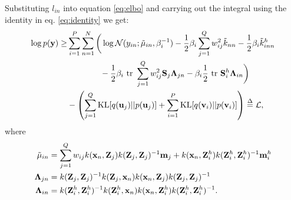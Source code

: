 
\noindent Substituting $l_{in}$ into equation \ref{eq:elbo} and carrying out the integral using the identity in eq. \ref{eq:identity} we get:
\begin{align}
\nonumber
\log p(\mathbf{y})
\ge& \sum_{i=1}^P \sum_{n=1}^N
\bigg( \log \mathcal{N}(y_{in}; \tilde{\mu}_{in}, \beta_i^{-1})
          - \frac{1}{2} \beta_i \sum_{j=1}^Q w_{ij}^2        \tilde{k}_{nn} - \frac{1}{2} \beta_i \tilde{k}^h_{inn}
 \\ \nonumber
         &\quad \quad \quad \quad - \frac{1}{2} \beta_i \mbox{ \rm tr }  \sum_{j=1}^Q w_{ij}^2 \mathbf{S}_j \mathbf{\Lambda}_{jn} - \beta_i \frac{1}{2} \mbox{ \rm tr } \mathbf{S}^h_i \mathbf{\Lambda}_{in} 
\bigg) \\
&- \left(\sum_{j=1}^Q \text{KL}[q(\mathbf{u}_j) || p(\mathbf{u}_j)] + \sum_{i=1}^P \text{KL}[q(\mathbf{v}_i) || p(\mathbf{v}_i)] \right) \overset{\Delta}{=} \mathcal{L},
\end{align}
where 
\newcommand{\Zg}{\Z_g}
\newcommand{\Zi}{\Z_i}
\begin{align}
\tilde{\mu}_{in}
&= \sum_{j=1}^Q w_{ij} k(\mathbf{x}_n, \mathbf{Z}_j)k(\mathbf{Z}_j,\mathbf{Z}_j)^{-1}\mathbf{m}_j + k(\mathbf{x}_n, \mathbf{Z}^h_i)k(\mathbf{Z}^h_i,\mathbf{Z}^h_i)^{-1}\mathbf{m}^h_i \\
\mathbf{\Lambda}_{jn}
&= k(\mathbf{Z}_j,\mathbf{Z}_j)^{-1} k(\mathbf{Z}_j, \mathbf{x}_n) k(\mathbf{x}_n, \mathbf{Z}_j) k(\mathbf{Z}_j,\mathbf{Z}_j)^{-1} \\
\mathbf{\Lambda}_{in}
&= k(\mathbf{Z}^h_i,\mathbf{Z}^h_i)^{-1} k(\mathbf{Z}^h_i, \mathbf{x}_n) k(\mathbf{x}_n, \mathbf{Z}^h_i) k(\mathbf{Z}^h_i,\mathbf{Z}^h_i)^{-1}.
\end{align}

